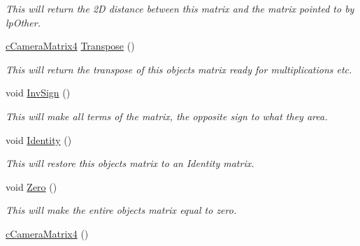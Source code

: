 \begin{DoxyCompactItemize}
\begin{DoxyCompactList}\small\item\em This will return the 2D distance between this matrix and the matrix pointed to by lpOther. \end{DoxyCompactList}\item 
\hypertarget{classc_camera_matrix4_ac1fa4dd9add669a8faecd0ca79713278}{
\hyperlink{classc_camera_matrix4}{cCameraMatrix4} \hyperlink{classc_camera_matrix4_ac1fa4dd9add669a8faecd0ca79713278}{Transpose} ()}
\label{classc_camera_matrix4_ac1fa4dd9add669a8faecd0ca79713278}

\begin{DoxyCompactList}\small\item\em This will return the transpose of this objects matrix ready for multiplications etc. \end{DoxyCompactList}\item 
\hypertarget{classc_camera_matrix4_a97d111c444dd87ecec278e585fe058a7}{
void \hyperlink{classc_camera_matrix4_a97d111c444dd87ecec278e585fe058a7}{InvSign} ()}
\label{classc_camera_matrix4_a97d111c444dd87ecec278e585fe058a7}

\begin{DoxyCompactList}\small\item\em This will make all terms of the matrix, the opposite sign to what they area. \end{DoxyCompactList}\item 
\hypertarget{classc_camera_matrix4_a23a05c1aff8a58dc662f5b871b422c17}{
void \hyperlink{classc_camera_matrix4_a23a05c1aff8a58dc662f5b871b422c17}{Identity} ()}
\label{classc_camera_matrix4_a23a05c1aff8a58dc662f5b871b422c17}

\begin{DoxyCompactList}\small\item\em This will restore this objects matrix to an Identity matrix. \end{DoxyCompactList}\item 
\hypertarget{classc_camera_matrix4_a1ec81a7ec3274f89d2b8fb94923345c0}{
void \hyperlink{classc_camera_matrix4_a1ec81a7ec3274f89d2b8fb94923345c0}{Zero} ()}
\label{classc_camera_matrix4_a1ec81a7ec3274f89d2b8fb94923345c0}

\begin{DoxyCompactList}\small\item\em This will make the entire objects matrix equal to zero. \end{DoxyCompactList}\item 
\hypertarget{classc_camera_matrix4_a99df6d312702e5474c5fedad42c95026}{
\hyperlink{classc_camera_matrix4_a99df6d312702e5474c5fedad42c95026}{cCameraMatrix4} ()}
\label{classc_camera_matrix4_a99df6d312702e5474c5fedad42c95026}


\end{DoxyCompactItemize}
